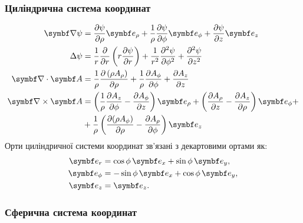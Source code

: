 \subsubsection{Циліндрична система координат}

\begin{align}\label{cylindric}
		\vect{\nabla}\psi & = \frac{\partial \psi}{\partial \rho} \vect{e}_{\rho} + \frac{1}{\rho}\frac{\partial \psi}{\partial \phi} \vect{e}_{\phi} + \frac{\partial \psi}{\partial z} \vect{e}_{z}                                                                                       \\
	\Laplasian\psi    & = \frac{1}{r} \frac{\partial }{\partial r} \left( r \frac{\partial \psi}{\partial r} \right) + \frac{1}{r^2} \frac{\partial^2 \psi}{\partial \phi^2} + \frac{\partial^2 \psi}{\partial z^2}                                                                   \\
	\divg\vect{A}     & = \frac{1}{\rho}\frac{\partial \left(\rho A_{\rho }\right)}{\partial \rho }+\frac{1}{\rho }\frac{\partial A_{\phi } }{\partial \phi }+\frac{\partial A_{z}}{\partial z}                                                                                    \\
	\rot\vect{A}      & =\left({\frac {1}{\rho }}{\frac {\partial A_{z}}{\partial \phi }}-{\frac {\partial A_{\phi }}{\partial z}}\right)\vect{e}_{\rho}+\left({\frac {\partial A_{\rho }}{\partial z}}-{\frac {\partial A_{z}}{\partial \rho }}\right)\vect{e}_{\phi} + \nonumber \\
	                  & +
	{\frac {1}{\rho }}\left({\frac {\partial (\rho A_{\phi })}{\partial \rho }}-{\frac {\partial A_{\rho }}{\partial \phi }}\right)\vect{e}_{z}
\end{align}
Орти циліндричної системи координат зв'язані з декартовими ортами як:
\begin{align}\label{}
    \vect{e}_r &= \cos\phi\, \vect{e}_x + \sin\phi\, \vect{e}_y, \\
    \vect{e}_{\phi} &= -\sin\phi\, \vect{e}_x + \cos\phi\, \vect{e}_y, \\
    \vect{e}_{z} &= \vect{e}_z.
\end{align}

\subsubsection{Сферична система координат}

